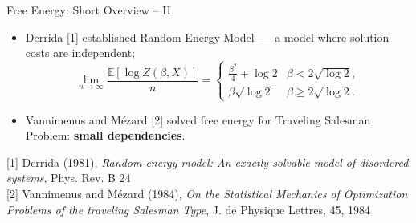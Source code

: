 \documentclass[presentation,12pt]{beamer}
\def\E{{\mathbb E}}
\begin{document}
\begin{frame}{Free Energy: Short Overview -- II}

\begin{itemize}
  \item Derrida [1] established Random Energy Model~--- a model where solution costs are independent;
  \[
    \lim_{n\to \infty} \frac{\E[\log Z(\beta, X)]}{n}=
    \left\{ \begin{array}{ll}
    \frac{\beta^2}{4}+\log 2 & 
    \beta < 2 \sqrt{\log 2},\\
    \beta \sqrt{\log 2} & \beta \ge 2 \sqrt{\log 2}.
    \end{array}
    \right.
  \]
  
  \item Vannimenus and M\'ezard [2] solved free energy for Traveling Salesman
    Problem: \textbf{small dependencies}.
  
  \bigskip

\end{itemize}

\vfill

{
  \textcolor{gray!60}{
    \scriptsize [1] Derrida (1981), 
    \textit{Random-energy model: An exactly solvable model of disordered systems},
    Phys. Rev. B 24} \\
  \textcolor{gray!60}{
    \scriptsize [2] Vannimenus and M\'ezard (1984), 
    \textit{On the Statistical Mechanics of Optimization Problems of the traveling Salesman Type}, 
    J. de Physique Lettres, 45, 1984} \par
}

\end{frame}
\end{document}
